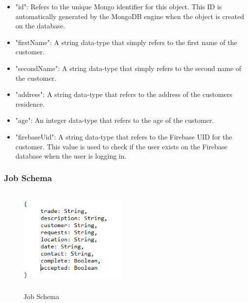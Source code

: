 \bigskip

\begin{itemize}

\item "id": Refers to the unique Mongo identifier for this object. This ID is automatically generated by the MongoDB engine when the object is created on the database.

\item "firstName": A string data-type that simply refers to the first name of the customer.

\item "secondName": A string data-type that simply refers to the second name of the customer.

\item "address": A string data-type that refers to the address of the customers residence. 

\item "age": An integer data-type that refers to the age of the customer.

\item "firebaseUid": A string data-type that refers to the Firebase UID for the customer. This value is used to check if the user exists on the Firebase database when the user is logging in.

\end{itemize}
\bigskip

\subsubsection{Job Schema}
\label{sec:SystemDesignJobSchema}

\begin{figure}[H]
    \centering
    \includegraphics[width=150pt, height=150pt]{DesignImages/JobSchema.PNG}
    \caption{Job Schema}
    \label{fig:my_label}
\end{figure}

